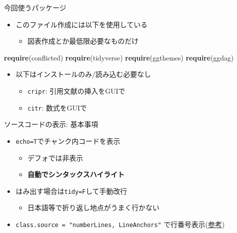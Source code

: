 \documentclass[14pt,ignorenonframetext,]{beamer}
\newenvironment{Shaded}{\begin{snugshade}}{\end{snugshade}}
\newcommand{\KeywordTok}[1]{\textcolor[rgb]{0.13,0.29,0.53}{\textbf{#1}}}
\newcommand{\NormalTok}[1]{#1}
\providecommand{\tightlist}{%
  \setlength{\itemsep}{0pt}\setlength{\parskip}{0pt}}
\begin{document}
\begin{frame}[fragile]{今回使うパッケージ}
\protect\hypertarget{ux4ecaux56deux4f7fux3046ux30d1ux30c3ux30b1ux30fcux30b8}{}

\begin{itemize}
\tightlist
\item
  このファイル作成には以下を使用している

  \begin{itemize}
  \tightlist
  \item
    図表作成とか最低限必要なものだけ
  \end{itemize}
\end{itemize}

\begin{Shaded}
\begin{Highlighting}[numbers=left,,]
\KeywordTok{require}\NormalTok{(conflicted)}
\KeywordTok{require}\NormalTok{(tidyverse)}
\KeywordTok{require}\NormalTok{(ggthemes)}
\KeywordTok{require}\NormalTok{(ggdag)}
\end{Highlighting}
\end{Shaded}

\begin{itemize}
\tightlist
\item
  以下はインストールのみ/読み込む必要なし

  \begin{itemize}
  \tightlist
  \item
    \texttt{cripr}: 引用文献の挿入をGUIで
  \item
    \texttt{citr}: 数式をGUIで
  \end{itemize}
\end{itemize}

\end{frame}

\begin{frame}[fragile]{ソースコードの表示: 基本事項}
\protect\hypertarget{ux30bdux30fcux30b9ux30b3ux30fcux30c9ux306eux8868ux793a-ux57faux672cux4e8bux9805}{}

\begin{itemize}
\tightlist
\item
  \texttt{echo=T}でチャンク内コードを表示

  \begin{itemize}
  \tightlist
  \item
    デフォでは非表示
  \item
    \textbf{自動でシンタックスハイライト}
  \end{itemize}
\item
  はみ出す場合は\texttt{tidy=F}して手動改行

  \begin{itemize}
  \tightlist
  \item
    日本語等で折り返し地点がうまく行かない
  \end{itemize}
\item
  \texttt{class.source\ =\ "numberLines,\ LineAnchors"}
  で行番号表示(\href{https://blog.atusy.net/2019/04/18/rmd-line-num/}{参考})
\end{itemize}

\end{frame}
\end{document}
